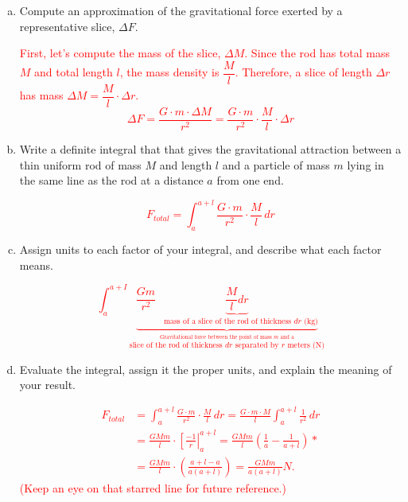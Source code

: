 \documentclass[12pt]{article}
\newcommand{\red}[1]{ \textcolor{red}{#1 } }
\begin{document}
\begin{enumerate}
\begin{enumerate}[(a)]
\red{The issue is that force is a nonconstant function of radius, $F(r)$.}

\item Compute an approximation of the gravitational force exerted by a representative slice, $\Delta F$.

\red{
First, let's compute the mass of the slice, $\Delta M$. Since the rod has total mass $M$ and total length $l$, the mass density is $\dfrac{M}{l}$. Therefore, a slice of length $\Delta r$ has mass $\Delta M = \dfrac{M}{l}\cdot\Delta r$.
\[\Delta F = \frac{G\cdot m \cdot \Delta M}{r^2} = \frac{G\cdot m}{r^2}\cdot\frac{M}{l}\cdot\Delta r\]
}
\item Write a definite integral that that gives the gravitational attraction between a thin uniform rod of mass \(M\) and length \(l\) and a particle of mass \(m\) lying in the same line as the rod at a distance $a$ from one end.

\red{
\[F_{total} = \int_a^{a+l} \frac{G\cdot m}{r^2}\cdot\frac{M}{l}\, dr\]
}

\item Assign units to each factor of your integral, and describe what each factor means.

\red{
\[\int_{a}^{a+I} \underbrace{ \frac{Gm}{r^2} \underbrace{\frac{M}{l}dr}_{\quad \text{mass of a slice of the rod of thickness \(dr\) (kg)} } }_{ \stackrel{\text{Gravitational force between the point of mass \(m\) and a} }{\text{slice of the rod of thickness \(dr\) separated by \(r\) meters (N)} } }\]
}

\item Evaluate the integral, assign it the proper units, and explain the meaning of your result.

\red{
\begin{align*}
F_{total} &= \int_a^{a+l} \frac{G\cdot m}{r^2}\cdot\frac{M}{l}\, dr 
= \frac{G\cdot m\cdot M}{l} \int_a^{a+l} \frac{1}{r^2}\,dr \\
&= \frac{GMm}{l}\cdot\left[\frac{-1}{r}\right|_a^{a+l} 
 = \frac{GMm}{l}\left(\frac{1}{a} - \frac{1}{a+l}\right) * \\
&= \frac{GMm}{l}\cdot\left(\frac{a+l-a}{a(a+l)}\right) 
 = \frac{GMm}{a(a+l)} \si{N}.
\end{align*}
(Keep an eye on that starred line for future reference.)
}


\end{enumerate}
\end{enumerate}
\end{document}
